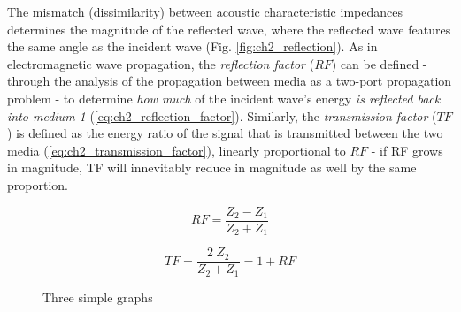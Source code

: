 The mismatch (dissimilarity) 
between acoustic characteristic impedances determines the magnitude of the reflected wave, 
where the reflected wave features the same angle as the incident wave (Fig. \ref{fig:ch2_reflection}). 
As in electromagnetic wave propagation, the \textit{reflection factor} ($RF$) can be defined - through the 
analysis of the propagation between media as a two-port propagation problem - to determine \textit{how much} 
of the incident wave's energy \textit{is reflected back into medium 1} (\ref{eq:ch2_reflection_factor}). 
Similarly, the \textit{transmission factor} ($TF$) is defined as the energy ratio of the signal that is 
transmitted between the two media (\ref{eq:ch2_transmission_factor}), linearly proportional to $RF$ - if RF grows in 
magnitude, TF will innevitably reduce in magnitude as well by the same proportion.

\begin{equation}
  RF = \frac{Z_2 - Z_1}{Z_2 + Z_1}
  \label{eq:ch2_reflection_factor}
\end{equation}

\begin{equation}
  TF = \frac{2 \ Z_2}{Z_2 + Z_1} = 1 + RF
  \label{eq:ch2_transmission_factor}
\end{equation}

\begin{figure}[!ht]
\centering
\begin{varwidth}{1.0\linewidth}
\end{varwidth}
\caption{Three simple graphs}
\label{fig:ch2_elastic_waves}
\end{figure}


